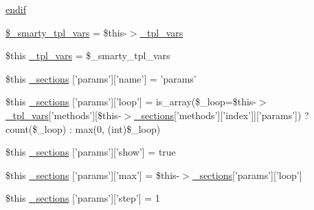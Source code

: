 \begin{DoxyCompactItemize}
\item 
\hyperlink{default_234d6fa4bfd5eef6424a9ddc74a166350_2_06_06-14_05_06_06-1407541581_05method_8tpl_8php_a82cd33ca97ff99f2fcc5e9c81d65251b}{endif}
\item 
\hyperlink{default_234d6fa4bfd5eef6424a9ddc74a166350_2_06_06-14_05_06_06-1407541581_05method_8tpl_8php_a14dde6d029d65a879ee7bc1ebc398dd1}{\$\-\_\-smarty\-\_\-tpl\-\_\-vars} = \$this-\/$>$\hyperlink{_06_06127_05_06_0612781687_05pkgelementindex_8tpl_8php_a4a4846d8e68d455590131a05697f67a3}{\-\_\-tpl\-\_\-vars}
\item 
\$this \hyperlink{default_234d6fa4bfd5eef6424a9ddc74a166350_2_06_06-14_05_06_06-1407541581_05method_8tpl_8php_a4a4846d8e68d455590131a05697f67a3}{\-\_\-tpl\-\_\-vars} = \$\-\_\-smarty\-\_\-tpl\-\_\-vars
\item 
\$this \hyperlink{default_234d6fa4bfd5eef6424a9ddc74a166350_2_06_06-14_05_06_06-1407541581_05method_8tpl_8php_af0c558580cadde41ff509db542bdc0fa}{\-\_\-sections} \mbox{[}'params'\mbox{]}\mbox{[}'name'\mbox{]} = 'params'
\item 
\$this \hyperlink{default_234d6fa4bfd5eef6424a9ddc74a166350_2_06_06-14_05_06_06-1407541581_05method_8tpl_8php_a9d3e8a5d01be8e45d5623bdb21004c73}{\-\_\-sections} \mbox{[}'params'\mbox{]}\mbox{[}'loop'\mbox{]} = is\-\_\-array(\$\-\_\-loop=\$this-\/$>$\hyperlink{_06_06127_05_06_0612781687_05pkgelementindex_8tpl_8php_a4a4846d8e68d455590131a05697f67a3}{\-\_\-tpl\-\_\-vars}\mbox{[}'methods'\mbox{]}\mbox{[}\$this-\/$>$\hyperlink{_06_06127_05_06_0612781687_05pkgelementindex_8tpl_8php_a9e3d26b39edfe29c3f29b8035ef33828}{\-\_\-sections}\mbox{[}'methods'\mbox{]}\mbox{[}'index'\mbox{]}\mbox{]}\mbox{[}'params'\mbox{]}) ? count(\$\-\_\-loop) \-: max(0, (int)\$\-\_\-loop)
\item 
\$this \hyperlink{default_234d6fa4bfd5eef6424a9ddc74a166350_2_06_06-14_05_06_06-1407541581_05method_8tpl_8php_a7483e4eb34499b67a6fb0c13d79fe772}{\-\_\-sections} \mbox{[}'params'\mbox{]}\mbox{[}'show'\mbox{]} = true
\item 
\$this \hyperlink{default_234d6fa4bfd5eef6424a9ddc74a166350_2_06_06-14_05_06_06-1407541581_05method_8tpl_8php_a2f60b60d8fb7c59b00fb8b963513cda2}{\-\_\-sections} \mbox{[}'params'\mbox{]}\mbox{[}'max'\mbox{]} = \$this-\/$>$\hyperlink{_06_06127_05_06_0612781687_05pkgelementindex_8tpl_8php_a9e3d26b39edfe29c3f29b8035ef33828}{\-\_\-sections}\mbox{[}'params'\mbox{]}\mbox{[}'loop'\mbox{]}
\item 
\$this \hyperlink{default_234d6fa4bfd5eef6424a9ddc74a166350_2_06_06-14_05_06_06-1407541581_05method_8tpl_8php_a64871533fcee968904deb401cb1d5199}{\-\_\-sections} \mbox{[}'params'\mbox{]}\mbox{[}'step'\mbox{]} = 1

\end{DoxyCompactItemize}
